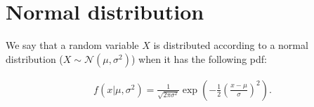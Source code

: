 \section{Normal distribution}\label{sec:normaldist}

We say that a random variable $X$ is distributed according to a normal distribution ($X \sim \mathcal{N}(\mu, \sigma^2)$) when it has the following \gls{pdf}:

\begin{definition}
    \begin{align*}
        f(x|\mu, \sigma^2) = \frac{1}{\sqrt{2\pi\sigma^2}} \exp{\left(-\frac{1}{2}\left(\frac{x-\mu}{\sigma}\right)^2\right)}.
    \end{align*}
\end{definition}
